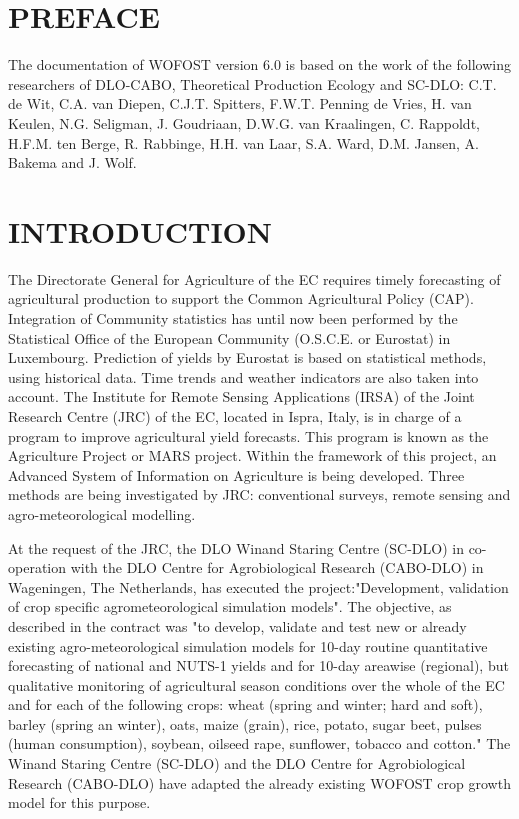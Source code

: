 
\chapter*{PREFACE}

The documentation of WOFOST version 6.0 is based on the work of the following
researchers of DLO-CABO, Theoretical Production Ecology and SC-DLO: C.T. de
Wit, C.A. van Diepen, C.J.T. Spitters, F.W.T. Penning de Vries, H. van Keulen, N.G.
Seligman, J. Goudriaan, D.W.G. van Kraalingen, C. Rappoldt, H.F.M. ten Berge, R.
Rabbinge, H.H. van Laar, S.A. Ward, D.M. Jansen, A. Bakema and J. Wolf.
\newpage

\chapter*{INTRODUCTION}

The Directorate General for Agriculture of the EC requires timely forecasting of
agricultural production to support the Common Agricultural Policy (CAP). 
Integration of Community statistics has until now been performed by the Statistical Office of
the European Community (O.S.C.E. or Eurostat) in Luxembourg. Prediction of yields
by Eurostat is based on statistical methods, using historical data. Time trends and
weather indicators are also taken into account. The Institute for Remote Sensing
Applications (IRSA) of the Joint Research Centre (JRC) of the EC, located in Ispra,
Italy, is in charge of a program to improve agricultural yield forecasts. This program
is known as the Agriculture Project or MARS project. Within the framework of this
project, an Advanced System of Information on Agriculture is being developed. Three
methods are being investigated by JRC: conventional surveys, remote sensing and
agro-meteorological modelling.

At the request of the JRC, the DLO Winand Staring Centre (SC-DLO) in co-operation with the 
DLO Centre for Agrobiological Research (CABO-DLO) in
Wageningen, The Netherlands, has executed the project:"Development, validation of
crop specific agrometeorological simulation models". The objective, as described in
the contract was "to develop, validate and test new or already existing agro-meteorological simulation models for 10-day routine quantitative forecasting of national and
NUTS-1 yields  and for 10-day areawise (regional), but qualitative monitoring of
agricultural season conditions over the whole of the EC and for each of the following
crops: wheat (spring and winter; hard and soft), barley (spring an winter), oats, maize
(grain), rice, potato, sugar beet, pulses (human consumption), soybean, oilseed rape,
sunflower, tobacco and cotton."  The Winand Staring Centre (SC-DLO) and the DLO
Centre for Agrobiological Research (CABO-DLO) have adapted the already existing
WOFOST crop growth model for this purpose.

